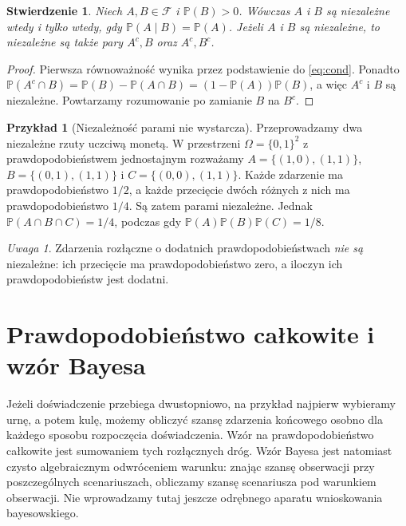 \documentclass[11pt,a4paper,oneside]{report}
\numberwithin{equation}{chapter}
\theoremstyle{plain}
\newtheorem{stwierdzenie}[twierdzenie]{Stwierdzenie}
\theoremstyle{definition}
\newtheorem{przyklad}{Przykład}[chapter]
\theoremstyle{remark}
\newtheorem{uwaga}{Uwaga}[chapter]
\newcommand{\Prob}{\mathbb{P}}
\begin{document}
\begin{stwierdzenie}
Niech $A,B\in\mathcal F$ i $\Prob(B)>0$.
Wówczas $A$ i $B$ są niezależne wtedy i tylko wtedy, gdy
$\Prob(A\mid B)=\Prob(A)$. Jeżeli $A$ i $B$ są niezależne,
to niezależne są także pary $A^c,B$ oraz $A^c,B^c$.
\end{stwierdzenie}
\begin{proof}
Pierwsza równoważność wynika przez podstawienie do \eqref{eq:cond}.
Ponadto $\Prob(A^c\cap B)=\Prob(B)-\Prob(A\cap B)
=(1-\Prob(A))\Prob(B)$, a więc $A^c$ i $B$ są niezależne.
Powtarzamy rozumowanie po zamianie $B$ na $B^c$.
\end{proof}

\begin{przyklad}[Niezależność parami nie wystarcza]
Przeprowadzamy dwa niezależne rzuty uczciwą monetą.
W przestrzeni $\Omega=\{0,1\}^2$ z prawdopodobieństwem jednostajnym
rozważamy $A=\{(1,0),(1,1)\}$,
$B=\{(0,1),(1,1)\}$ i $C=\{(0,0),(1,1)\}$.
Każde zdarzenie ma prawdopodobieństwo $1/2$, a każde przecięcie
dwóch różnych z nich ma prawdopodobieństwo $1/4$.
Są zatem parami niezależne. Jednak $\Prob(A\cap B\cap C)=1/4$,
podczas gdy $\Prob(A)\Prob(B)\Prob(C)=1/8$.
\end{przyklad}

\begin{uwaga}
Zdarzenia rozłączne o dodatnich prawdopodobieństwach \emph{nie są}
niezależne: ich przecięcie ma prawdopodobieństwo zero,
a iloczyn ich prawdopodobieństw jest dodatni.
\end{uwaga}

\section{Prawdopodobieństwo całkowite i wzór Bayesa}
Jeżeli doświadczenie przebiega dwustopniowo, na przykład najpierw
wybieramy urnę, a potem kulę, możemy obliczyć szansę zdarzenia
końcowego osobno dla każdego sposobu rozpoczęcia doświadczenia.
Wzór na prawdopodobieństwo całkowite jest sumowaniem tych
rozłącznych dróg. Wzór Bayesa jest natomiast czysto algebraicznym
odwróceniem warunku: znając szansę obserwacji przy poszczególnych
scenariuszach, obliczamy szansę scenariusza pod warunkiem obserwacji.
Nie wprowadzamy tutaj jeszcze odrębnego aparatu wnioskowania
bayesowskiego.
\end{document}
